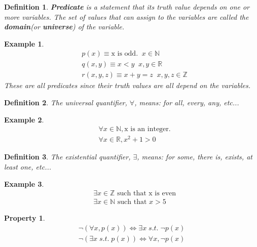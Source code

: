\documentclass{article}
\newtheorem{definition}{Definition}
\newtheorem{property}{Property}
\newtheorem{ex}{Example}
\begin{document}
\begin{definition}
	\textbf{Predicate} is a statement that its truth value depends on one or more variables. The set of values that can assign to the variables are called the \textbf{domain}(or \textbf{universe}) of the variable.
\end{definition}

\begin{ex}
	\begin{align}
	&p(x)\equiv\text{x is odd}.\;\;x\in\mathbb{N}\\
	&q(x,y)\equiv x<y\;\;x,y\in\mathbb{R}\\
	&r(x,y,z)\equiv x+y=z\;\;x,y,z\in\mathbb{Z}
	\end{align}
	These are all predicates since their truth values are all depend on the variables.
\end{ex}


\begin{definition}
	The universal quantifier, $\forall$, means: for all, every, any, etc...
\end{definition}

\begin{ex}
	\begin{align}
	&\forall x\in \mathbb{N}, \text{x is an integer}.\\
	&\forall x\in \mathbb{R}, x^2+1 >0
	\end{align}
\end{ex}


\begin{definition}
	The existential quantifier, $\exists$, means: for some, there is, exists, at least one, etc...
\end{definition}

\begin{ex}
	\begin{align}
	&\exists x\in\mathbb{Z} \text{ such that x is even}\\
	&\exists x\in\mathbb{N} \text{ such that } x>5
	\end{align}
\end{ex}

\begin{property}
	\begin{align*}
	\neg (\forall x, p(x)) \Leftrightarrow \exists x\;s.t.\;\neg p(x)\\
	\neg (\exists x\;s.t.\;p(x)) \Leftrightarrow \forall x, \neg p(x)
	\end{align*}
\end{property}
\end{document}
